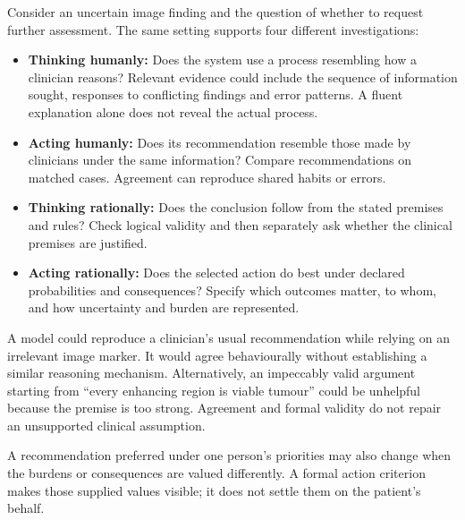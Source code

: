\biomedicalanswer
{}
Consider an uncertain image finding and the question of whether to request further assessment. The same setting supports four different investigations:
\begin{itemize}
\item \textbf{Thinking humanly:} Does the system use a process resembling how a clinician reasons? Relevant evidence could include the sequence of information sought, responses to conflicting findings and error patterns. A fluent explanation alone does not reveal the actual process.
\item \textbf{Acting humanly:} Does its recommendation resemble those made by clinicians under the same information? Compare recommendations on matched cases. Agreement can reproduce shared habits or errors.
\item \textbf{Thinking rationally:} Does the conclusion follow from the stated premises and rules? Check logical validity and then separately ask whether the clinical premises are justified.
\item \textbf{Acting rationally:} Does the selected action do best under declared probabilities and consequences? Specify which outcomes matter, to whom, and how uncertainty and burden are represented.
\end{itemize}
A model could reproduce a clinician's usual recommendation while relying on an irrelevant image marker. It would agree behaviourally without establishing a similar reasoning mechanism. Alternatively, an impeccably valid argument starting from ``every enhancing region is viable tumour'' could be unhelpful because the premise is too strong. Agreement and formal validity do not repair an unsupported clinical assumption.

A recommendation preferred under one person's priorities may also change when the burdens or consequences are valued differently. A formal action criterion makes those supplied values visible; it does not settle them on the patient's behalf.

